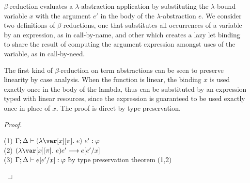 $\beta$-reduction evaluates a $\lambda$-abstraction application by substituting
the $\lambda$-bound variable $x$ with the argument $e'$ in the body of the
$\lambda$-abstraction $e$.
%
We consider two definitions of $\beta$-reductions, one that substitutes all
occurrences of a variable by an expression, as in call-by-name, and other which
creates a lazy let binding to share the result of computing the argument
expression amongst uses of the variable, as in call-by-need.

The first kind of $\beta$-reduction on term abstractions can be seen to
preserve linearity by case analysis. When the function is linear, the binding
$x$ is used exactly once in the body of the lambda, thus can be substituted by
an expression typed with linear resources, since the expression is guaranteed
to be used exactly once in place of $x$. The proof is direct by type preservation.

\BetaReductionTheorem

\begin{proof}
~
\begin{tabbing}
    (1) $\G; \D \vdash (\lambda \x[\pi].~e)~e' : \vp$\\
    (2) $(\lambda \x[\pi].~e) e' \longrightarrow e[e'/x]$\\
    (3) $\Gamma; \Delta \vdash e[e'/x] : \varphi$ \` by type preservation theorem (1,2)\\

\end{tabbing}
\end{proof}

